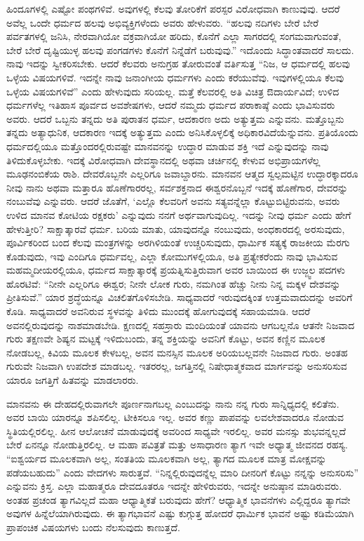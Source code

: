 ಹಿಂದೂಗಳಲ್ಲಿ ಎಷ್ಟೋ ಪಂಥಗಳಿವೆ. ಅವುಗಳಲ್ಲಿ ಕೆಲವು ತೋರಿಕೆಗೆ ಪರಸ್ಪರ ವಿರೋಧವಾಗಿ ಕಾಣುವುವು. ಆದರೆ ಅವೆಲ್ಲ ಒಂದೇ ಧರ್ಮದ ಹಲವು ಅಭಿವ್ಯಕ್ತಿಗಳೆಂದು ಅವರು ಹೇಳುವರು. “ಹಲವು ನದಿಗಳು ಬೇರೆ ಬೇರೆ ಪರ್ವತಗಳಲ್ಲಿ ಜನಿಸಿ, ನೇರವಾಗಿಯೋ ವಕ್ರವಾಗಿಯೋ ಹರಿದು, ಕೊನೆಗೆ ಎಲ್ಲಾ ಸಾಗರದಲ್ಲಿ ಸಂಗಮವಾಗುವಂತೆ, ಬೇರೆ ಬೇರೆ ದೃಷ್ಟಿಯುಳ್ಳ ಹಲವು ಪಂಗಡಗಳು ಕೊನೆಗೆ ನಿನ್ನೆಡೆಗೆ ಬರುವುವು.” ಇದೊಂದು ಸಿದ್ಧಾಂತವಾದರೆ ಸಾಲದು. ನಾವು ಇದನ್ನು ಸ್ವೀಕರಿಸಬೇಕು. ಆದರೆ ಕೆಲವರು ಅನುಗ್ರಹ ತೋರುವಂತೆ ವರ್ತಿಸುತ್ತ “ನಿಜ, ಆ ಧರ್ಮದಲ್ಲಿ ಹಲವು ಒಳ್ಳೆಯ ವಿಷಯಗಳಿವೆ. ಇದನ್ನೇ ನಾವು ಜನಾಂಗೀಯ ಧರ್ಮಗಳು ಎಂದು ಕರೆಯುವೆವು. ಇವುಗಳಲ್ಲಿಯೂ ಕೆಲವು ಒಳ್ಳೆಯ ವಿಷಯಗಳಿವೆ” ಎಂದು ಹೇಳುವುದು ಸರಿಯಲ್ಲ. ಮತ್ತೆ ಕೆಲವರಲ್ಲಿ ಅತಿ ವಿಚಿತ್ರ ಔದಾರ್ಯವಿದೆ; ಉಳಿದ ಧರ್ಮಗಳೆಲ್ಲ ಇತಿಹಾಸ ಪೂರ್ವದ ಅವಶೇಷಗಳು, ಆದರೆ ನಮ್ಮದು ಧರ್ಮದ ಪರಾಕಾಷ್ಠೆ ಎಂದು ಭಾವಿಸುವರು ಅವರು. ಆದರೆ ಒಬ್ಬನು ತನ್ನದು ಅತಿ ಪುರಾತನ ಧರ್ಮ, ಆದಕಾರಣ ಅದು ಅತ್ಯುತ್ತಮ ಎನ್ನುವನು. ಮತ್ತೊಬ್ಬನು ತನ್ನದು ಅತ್ಯಾಧುನಿಕ, ಆದಕಾರಣ ಇದಕ್ಕೆ ಅತ್ಯುತ್ತಮ ಎಂದು ಅನಿಸಿಕೊಳ್ಳಲಿಕ್ಕೆ ಅಧಿಕಾರವಿದೆಯೆನ್ನುವನು. ಪ್ರತಿಯೊಂದು ಧರ್ಮದಲ್ಲಿಯೂ ಮತ್ತೊಂದರಲ್ಲಿರುವಷ್ಟೇ ಮಾನವನನ್ನು ಉದ್ಧಾರ ಮಾಡುವ ಶಕ್ತಿ ಇದೆ ಎನ್ನುವುದನ್ನು ನಾವು ತಿಳಿದುಕೊಳ್ಳಬೇಕು. ಇದಕ್ಕೆ ವಿರೋಧವಾಗಿ ದೇವಸ್ಥಾನದಲ್ಲಿ ಅಥವಾ ಚರ್ಚಿನಲ್ಲಿ ಕೇಳುವ ಅಭಿಪ್ರಾಯಗಳೆಲ್ಲ ಮೂಢನಂಬಿಕೆಯ ರಾಶಿ. ದೇವರೊಬ್ಬನೇ ಎಲ್ಲರಿಗೂ ಜವಾಬ್ದಾರನು. ಮಾನವನ ಆತ್ಮದ ಸ್ವಲ್ಪಮಟ್ಟಿನ ಉದ್ಧಾರಕ್ಕಾದರೂ ನೀವು ನಾನು ಅಥವಾ ಮತ್ತಾರೂ ಹೊಣೆಗಾರರಲ್ಲ, ಸರ್ವಶಕ್ತನಾದ ಈಶ್ವರನೊಬ್ಬನೆ ಇದಕ್ಕೆ ಹೊಣೆಗಾರ, ದೇವರನ್ನು ನಂಬುವೆವು ಎನ್ನುವರು. ಆದರೆ ಜೊತೆಗೆ, ‘ಎಲ್ಲೊ ಕೆಲವರಿಗೆ ಅವನು ಸತ್ಯವನ್ನೆಲ್ಲಾ ಕೊಟ್ಟುಬಿಟ್ಟಿರುವನು, ಅವರು ಉಳಿದ ಮಾನವ ಕೋಟಿಯ ರಕ್ಷಕರು’ ಎನ್ನುವುದು ನನಗೆ ಅರ್ಥವಾಗುವುದಿಲ್ಲ. ಇದನ್ನು ನೀವು ಧರ್ಮ ಎಂದು ಹೇಗೆ ಹೇಳುತ್ತೀರಿ? ಸಾಕ್ಷಾತ್ಕಾರವೆ ಧರ್ಮ. ಬರಿಯ ಮಾತು, ಯಾವುದನ್ನೊ ನಂಬುವುದು, ಅಂಧಕಾರದಲ್ಲಿ ಅರಸುವುದು, ಪೂರ್ವಿಕರಿಂದ ಬಂದ ಕೆಲವು ಮಂತ್ರಗಳನ್ನು ಅರಗಿಳಿಯಂತೆ ಉಚ್ಚರಿಸುವುದು, ಧಾರ್ಮಿಕ ಸತ್ಯಕ್ಕೆ ರಾಜಕೀಯ ಮೆರಗು ಕೊಡುವುದು, ಇವು ಎಂದಿಗೂ ಧರ್ಮವಲ್ಲ, ಎಲ್ಲಾ ಕೋಮುಗಳಲ್ಲಿಯೂ, ಅತಿ ಪ್ರತ್ಯೇಕರೆಂದು ನಾವು ಭಾವಿಸುವ ಮಹಮ್ಮದೀಯರಲ್ಲಿಯೂ, ಧರ್ಮದ ಸಾಕ್ಷಾತ್ಕಾರಕ್ಕೆ ಪ್ರಯತ್ನಿಸುತ್ತಿರುವಾಗ ಅವರ ಬಾಯಿಂದ ಈ ಉಜ್ಜ್ವಲ ಪದಗಳು ಹೊರಟಿವೆ: “ನೀನೇ ಎಲ್ಲರಿಗೂ ಈಶ್ವರ; ನೀನೇ ಲೋಕ ಗುರು, ನಮಗಿಂತ ಹೆಚ್ಚು ನೀನು ನಿನ್ನ ಮಕ್ಕಳ ದೇಶವನ್ನು ಪ್ರೀತಿಸುವೆ.” ಯಾರ ಶ್ರದ್ಧೆಯನ್ನೂ ವಿಚಲಿತಗೊಳಿಸಬೇಡಿ. ಸಾಧ್ಯವಾದರೆ ಇರುವುದಕ್ಕಿಂತ ಉತ್ತಮವಾದುದನ್ನು ಅವರಿಗೆ ಕೊಡಿ. ಸಾಧ್ಯವಾದರೆ ಅವನಿರುವ ಸ್ಥಳವನ್ನು ತಿಳಿದು ಮುಂದಕ್ಕೆ ಹೋಗುವುದಕ್ಕೆ ಸಹಾಯಮಾಡಿ. ಆದರೆ ಅವನಲ್ಲಿರುವುದನ್ನು ನಾಶಮಾಡಬೇಡಿ. ಕ್ಷಣದಲ್ಲಿ ಸಹಸ್ರಾರು ಮಂದಿಯಂತೆ ಯಾವನು ಆಗಬಲ್ಲನೊ ಆತನೇ ನಿಜವಾದ ಗುರು ತಕ್ಷಣವೇ ಶಿಷ್ಯನ ಮಟ್ಟಕ್ಕೆ ಇಳಿದುಬಂದು, ತನ್ನ ಶಕ್ತಿಯನ್ನು ಅವನಿಗೆ ಕೊಟ್ಟು, ಅವನ ಕಣ್ಣಿನ ಮೂಲಕ ನೋಡಬಲ್ಲ, ಕಿವಿಯ ಮೂಲಕ ಕೇಳಬಲ್ಲ, ಅವನ ಮನಸ್ಸಿನ ಮೂಲಕ ಅರಿಯಬಲ್ಲವನೇ ನಿಜವಾದ ಗುರು. ಅಂತಹ ಗುರುವೇ ನಿಜವಾಗಿ ಉಪದೇಶ ಮಾಡಬಲ್ಲ. ಇತರರಲ್ಲ, ಜಗತ್ತಿನಲ್ಲಿ ನಿಷೇಧಾತ್ಮಕವಾದ ಮಾರ್ಗವನ್ನು ಅನುಸರಿಸುವ ಯಾರೂ ಜಗತ್ತಿಗೆ ಹಿತವನ್ನು ಮಾಡಲಾರರು.

ಮಾನವನು ಈ ದೇಹದಲ್ಲಿರುವಾಗಲೇ ಪೂರ್ಣನಾಗಬಲ್ಲ ಎಂಬುದನ್ನು ನಾನು ನನ್ನ ಗುರು ಸಾನ್ನಿಧ್ಯದಲ್ಲಿ ಕಲಿತೆನು. ಅವರ ಬಾಯಿ ಯಾರನ್ನೂ ಶಪಿಸಲಿಲ್ಲ. ಟೀಕಿಸಲೂ ಇಲ್ಲ. ಅವರ ಕಣ್ಣು ಪಾಪವನ್ನು ಲವಲೇಶವಾದರೂ ನೋಡುವ ಸ್ಥಿತಿಯಲ್ಲಿರಲಿಲ್ಲ. ಹೀನ ಆಲೋಚನೆ ಮಾಡುವುದಕ್ಕೆ ಅವರಿಂದ ಸಾಧ್ಯವೇ ಇರಲಿಲ್ಲ. ಅವರ ಮನಸ್ಸು ಶುಭವನ್ನಲ್ಲದೆ ಬೇರೆ ಏನನ್ನೂ ನೋಡುತ್ತಿರಲಿಲ್ಲ. ಆ ಮಹಾ ಪವಿತ್ರತೆ ಮತ್ತು ಅಸಾಧಾರಣ ತ್ಯಾಗ ಇವೇ ಅಧ್ಯಾತ್ಮ ಜೀವನದ ರಹಸ್ಯ. “ಐಶ್ವರ್ಯದ ಮೂಲಕವಾಗಿ ಅಲ್ಲ, ಸಂತತಿಯ ಮೂಲಕವಾಗಿ ಅಲ್ಲ, ತ್ಯಾಗದ ಮೂಲಕ ಮಾತ್ರ ಮೋಕ್ಷವನ್ನು ಪಡೆಯಬಹುದು” ಎಂದು ವೇದಗಳು ಸಾರುತ್ತವೆ. “ನಿನ್ನಲ್ಲಿರುವುದನ್ನೆಲ್ಲ ಮಾರಿ ದೀನರಿಗೆ ಕೊಟ್ಟು ನನ್ನನ್ನು ಅನುಸರಿಸು” ಎನ್ನುವನು ಕ್ರಿಸ್ತ. ಎಲ್ಲಾ ಮಹಾತ್ಮರೂ ದೇವದೂತರೂ ಇದನ್ನೇ ಹೇಳಿರುವರು, ಇದನ್ನೇ ಅನುಷ್ಠಾನ ಮಾಡಿರುವರು. ಅಂತಹ ಪ್ರಚಂಡ ತ್ಯಾಗವಿಲ್ಲದೆ ಮಹಾ ಆಧ್ಯಾತ್ಮಿಕತೆ ಬರುವುದು ಹೇಗೆ? ಆಧ್ಯಾತ್ಮಿಕ ಭಾವನೆಗಳು ಎಲ್ಲಿದ್ದರೂ ತ್ಯಾಗವೇ ಅವುಗಳ ಹಿನ್ನೆಲೆಯಾಗಿರುವುದು. ಈ ತ್ಯಾಗಭಾವನೆ ಎಷ್ಟು ಕುಗ್ಗುತ್ತ ಹೋದರೆ ಧಾರ್ಮಿಕ ಭಾವನೆ ಅಷ್ಟು ಕಡಿಮೆಯಾಗಿ ಪ್ರಾಪಂಚಿಕ ವಿಷಯಗಳು ಬಂದು ನೆಲಸುವುದು ಕಾಣುತ್ತದೆ.

